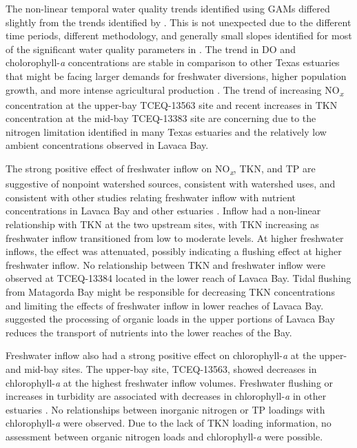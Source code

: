 \documentclass[water,article,submit,oneauthor]{Definitions/mdpi}
\begin{document}
The non-linear temporal water quality trends identified using GAMs
differed slightly from the trends identified by
\citet{bugicaWaterQualityTrends2020}. This is not unexpected due to the
different time periods, different methodology, and generally small
slopes identified for most of the significant water quality parameters
in \citet{bugica_water_2020}. The trend in DO and cholorophyll-\emph{a}
concentrations are stable in comparison to other Texas estuaries that
might be facing larger demands for freshwater diversions, higher
population growth, and more intense agricultural production
\citep{wetzWaterQualityDynamics2016, bugica_water_2020}. The trend of
increasing NO\textsubscript{\emph{x}} concentration at the upper-bay
TCEQ-13563 site and recent increases in TKN concentration at the mid-bay
TCEQ-13383 site are concerning due to the nitrogen limitation identified
in many Texas estuaries
\citep{gardnerNitrogenFixationDissimilatory2006, houTransformationFateNitrate2012, doradoUnderstandingInteractionsFreshwater2015, paudelRelationshipSuspendedSolids2019, wetz_exceptionally_2017}
and the relatively low ambient concentrations observed in Lavaca Bay.

The strong positive effect of freshwater inflow on
NO\textsubscript{\emph{x}}, TKN, and TP are suggestive of nonpoint
watershed sources, consistent with watershed uses, and consistent with
other studies relating freshwater inflow with nutrient concentrations in
Lavaca Bay and other estuaries
\citep{russell_effect_2006, caffreyHighNutrientPulses2007, peierlsNonmonotonicResponsesPhytoplankton2012, palmerImpactsDroughtsLow2015, ciraPhytoplanktonDynamicsLowInflow2021}.
Inflow had a non-linear relationship with TKN at the two upstream sites,
with TKN increasing as freshwater inflow transitioned from low to
moderate levels. At higher freshwater inflows, the effect was
attenuated, possibly indicating a flushing effect at higher freshwater
inflow. No relationship between TKN and freshwater inflow were observed
at TCEQ-13384 located in the lower reach of Lavaca Bay. Tidal flushing
from Matagorda Bay might be responsible for decreasing TKN
concentrations and limiting the effects of freshwater inflow in lower
reaches of Lavaca Bay. \citet{russell_effect_2006} suggested the
processing of organic loads in the upper portions of Lavaca Bay reduces
the transport of nutrients into the lower reaches of the Bay.

Freshwater inflow also had a strong positive effect on
chlorophyll-\emph{a} at the upper- and mid-bay sites. The upper-bay
site, TCEQ-13563, showed decreases in chlorophyll-\emph{a} at the
highest freshwater inflow volumes. Freshwater flushing or increases in
turbidity are associated with decreases in chlorophyll-\emph{a} in other
estuaries
\citep{peierlsNonmonotonicResponsesPhytoplankton2012, cloernPhytoplanktonPrimaryProduction2014}.
No relationships between inorganic nitrogen or TP loadings with
chlorophyll-\emph{a} were observed. Due to the lack of TKN loading
information, no assessment between organic nitrogen loads and
chlorophyll-\emph{a} were possible.
\end{document}
